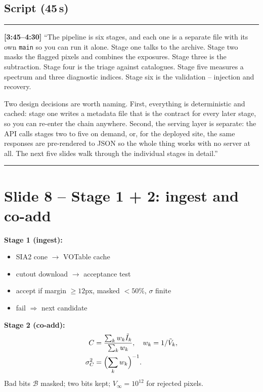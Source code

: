 \documentclass[11pt,a4paper]{article}
\begin{document}
\subsection*{Script (45\,s)}
\noindent\rule{\linewidth}{0.3pt}\par\smallskip\noindent
\textbf{[3:45--4:30]} ``The pipeline is six stages, and each one is a separate file with its own
\texttt{main} so you can run it alone. Stage one talks to the archive. Stage two masks the flagged
pixels and combines the exposures. Stage three is the subtraction. Stage four is the triage against
catalogues. Stage five measures a spectrum and three diagnostic indices. Stage six is the validation
-- injection and recovery.

Two design decisions are worth naming. First, everything is deterministic and cached: stage one writes
a metadata file that is the contract for every later stage, so you can re-enter the chain anywhere.
Second, the serving layer is separate: the API calls stages two to five on demand, or, for the
deployed site, the same responses are pre-rendered to JSON so the whole thing works with no server at
all. The next five slides walk through the individual stages in detail.''
\par\smallskip\noindent\rule{\linewidth}{0.3pt}

\section{Slide 8 -- Stage 1 + 2: ingest and co-add}

\textbf{Stage 1 (ingest):}
\begin{itemize}[leftmargin=1em,itemsep=1pt]
\item SIA2 cone $\to$ VOTable cache
\item cutout download $\to$ acceptance test
\item accept if margin $\ge 12$px, masked $< 50\%$, $\sigma$ finite
\item fail $\Rightarrow$ next candidate
\end{itemize}

\textbf{Stage 2 (co-add):}
\[
\begin{aligned}
  C &= \frac{\sum_k w_k \tilde I_k}{\sum_k w_k},\quad w_k = 1/\tilde V_k,\\
  \sigma^2_C &= \Bigl(\sum_k w_k\Bigr)^{-1}.
\end{aligned}
\]
Bad bits $\mathcal{B}$ masked; two bits kept; $V_\infty = 10^{12}$ for rejected pixels.
\end{document}
